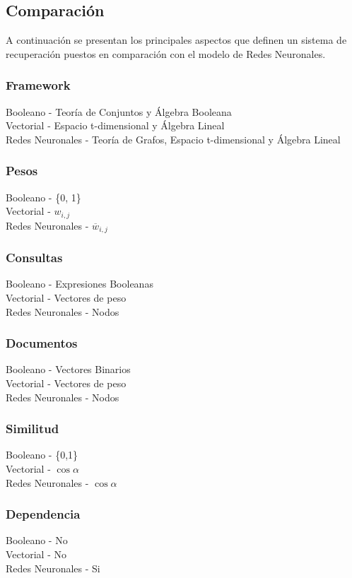 \documentclass{llncs}
\begin{document}
\begin{multicols}{2}[]
\subsection{Comparaci\'on}

A continuaci\'on se presentan los principales aspectos que definen un sistema de recuperaci\'on puestos en comparaci\'on con el modelo de Redes Neuronales.\\

\subsubsection{Framework}
Booleano - Teor\'ia de Conjuntos y \'Algebra Booleana \\
Vectorial - Espacio t-dimensional y \'Algebra Lineal \\
Redes Neuronales - Teor\'ia de Grafos, Espacio t-dimensional y \'Algebra Lineal

\subsubsection{Pesos}
Booleano - \{0, 1\} \\
Vectorial - $w_{i,j}$ \\
Redes Neuronales - $\overline{w}_{i, j}$

\subsubsection{Consultas}
Booleano -  Expresiones Booleanas \\
Vectorial - Vectores de peso \\
Redes Neuronales - Nodos

\subsubsection{Documentos}
Booleano -  Vectores Binarios \\
Vectorial - Vectores de peso \\
Redes Neuronales - Nodos

\subsubsection{Similitud}
Booleano -  \{0,1\} \\
Vectorial - $\cos{\alpha}$ \\
Redes Neuronales - $\cos{\alpha}$

\subsubsection{Dependencia}
Booleano -  No \\
Vectorial - No \\
Redes Neuronales - Si


\end{multicols}
\end{document}
